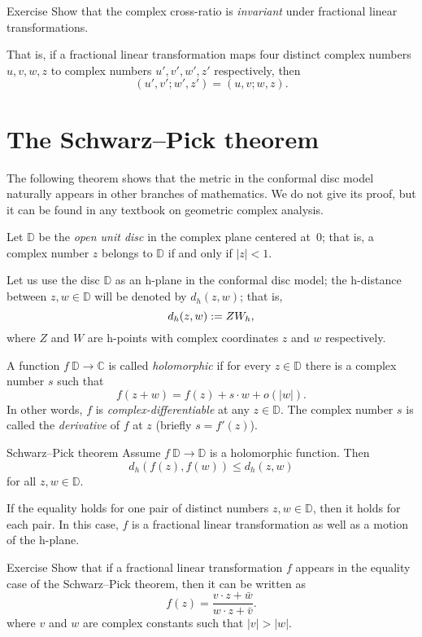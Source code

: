 \begin{thm}{Exercise}\label{ex:C-cross-ratio}
Show that the complex cross-ratio is {}\emph{invariant} under fractional linear transformations. 

That is, if a fractional linear transformation maps four distinct complex numbers $u, v, w, z$ to complex numbers $u', v', w', z'$ respectively, then
$$
(u',v';w',z')
=
(u,v;w,z).
$$

\end{thm}

\section{The Schwarz--Pick theorem}

The following theorem shows 
that the metric in the conformal disc model naturally appears in other branches of mathematics.
We do not give its proof, but it can be found in any textbook on geometric complex analysis.

Let $\mathbb{D}$ be the \emph{open unit disc} in the complex plane centered at~$0$;
that is, a complex number $z$
belongs to $\mathbb{D}$ if and only if $|z|<1$.

Let us use the disc $\mathbb{D}$ as an h-plane in the conformal disc model;
the h-distance between $z, w\in\mathbb{D}$ will be denoted by $d_h(z,w)$;
that is,
\[d_h(z,w):= ZW_h,\]
where $Z$ and $W$ are h-points with complex coordinates $z$ and $w$ respectively.

A function $f\:\mathbb{D}\to \mathbb{C}$ is called \emph{holomorphic} if for every $z\in \mathbb{D}$
there is a complex number $s$ such that
\[f(z+w)=f(z)+s\cdot w+o(|w|).\]
In other words, $f$ is {}\emph{complex-differentiable}
at any $z\in\mathbb{D}$.
The complex number $s$ is called the {}\emph{derivative} of $f$ at $z$ (briefly $s=f'(z)$).

\begin{thm}{Schwarz--Pick theorem}
Assume $f\: \mathbb{D}\to \mathbb{D}$ is a holomorphic function.
Then 
\[d_h(f(z),f(w))\le d_h(z,w)\]
for all $z,w\in \mathbb{D}$.

If the equality holds for one pair of distinct numbers $z,w\in \mathbb{D}$, then it holds for each pair.
In this case, $f$ is a fractional linear transformation as well as a motion of the h-plane.
\end{thm}

\begin{thm}{Exercise}\label{ex:schwarz-moebius}
Show that if a fractional linear transformation $f$ appears in the equality case of the Schwarz--Pick theorem, then it can be written as 
\[f(z)=\frac{v\cdot z+\bar w}{w\cdot z+\bar v}.\]
where $v$ and $w$ are complex constants such that $|v|>|w|$.
\end{thm}

